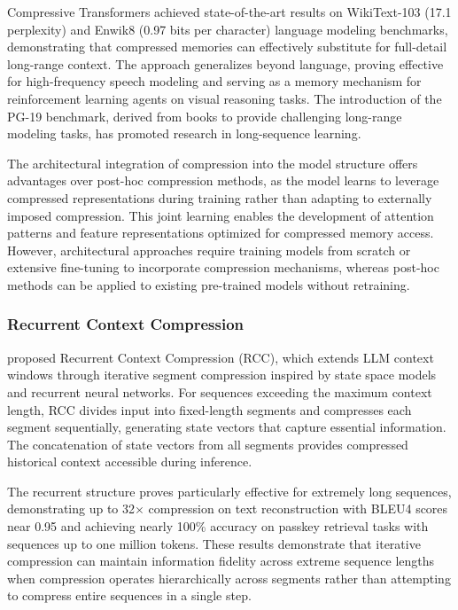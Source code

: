 Compressive Transformers achieved state-of-the-art results on WikiText-103 (17.1 perplexity) and Enwik8 (0.97 bits per character) language modeling benchmarks, demonstrating that compressed memories can effectively substitute for full-detail long-range context. The approach generalizes beyond language, proving effective for high-frequency speech modeling and serving as a memory mechanism for reinforcement learning agents on visual reasoning tasks. The introduction of the PG-19 benchmark, derived from books to provide challenging long-range modeling tasks, has promoted research in long-sequence learning.

The architectural integration of compression into the model structure offers advantages over post-hoc compression methods, as the model learns to leverage compressed representations during training rather than adapting to externally imposed compression. This joint learning enables the development of attention patterns and feature representations optimized for compressed memory access. However, architectural approaches require training models from scratch or extensive fine-tuning to incorporate compression mechanisms, whereas post-hoc methods can be applied to existing pre-trained models without retraining.

\subsubsection{Recurrent Context Compression}

\citet{ge2024recurrent} proposed Recurrent Context Compression (RCC), which extends LLM context windows through iterative segment compression inspired by state space models and recurrent neural networks. For sequences exceeding the maximum context length, RCC divides input into fixed-length segments and compresses each segment sequentially, generating state vectors that capture essential information. The concatenation of state vectors from all segments provides compressed historical context accessible during inference.

The recurrent structure proves particularly effective for extremely long sequences, demonstrating up to 32$\times$ compression on text reconstruction with BLEU4 scores near 0.95 and achieving nearly 100\% accuracy on passkey retrieval tasks with sequences up to one million tokens. These results demonstrate that iterative compression can maintain information fidelity across extreme sequence lengths when compression operates hierarchically across segments rather than attempting to compress entire sequences in a single step.


